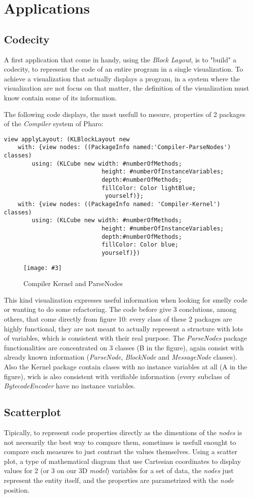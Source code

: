 \documentclass[runningheads]{llncs}
\newcommand{\fig}[4]{
	\begin{figure}[#1]
		\centering
		\texttt{[image: \#3]}
		\caption{\label{fig:#3}#4}
	\end{figure}}
\newcommand{\seclabel}[1]{\label{sec:#1}}
\begin{document}
\section{Applications} \seclabel{applications}

\subsection{Codecity}
A first application that come in handy, using the \emph{Block Layout},
is to "build" a codecity, to represent the code of an entire program
in a single visualization. To achieve a visualization that actually 
displays a program, in a system where the visualization are not focus
on that matter, the definition of the visualization must know contain
some of its information.

The following code displays, the most usefull to mesure, properties of 
2 packages of the \emph{Compiler} system of Pharo:
\begin{lstlisting}
view applyLayout: (KLBlockLayout new
	with: {view nodes: ((PackageInfo named:'Compiler-ParseNodes') classes) 
		using: (KLCube new width: #numberOfMethods; 
							height: #numberOfInstanceVariables; 
							depth:#numberOfMethods;
							fillColor: Color lightBlue;
							 yourself)};
	with: {view nodes: ((PackageInfo named: 'Compiler-Kernel') classes)
		using: (KLCube new width: #numberOfMethods; 
							height: #numberOfInstanceVariables; 
							depth:#numberOfMethods;
							fillColor: Color blue;
							yourself)})
\end{lstlisting}
\fig{}{1.0}{figure10.png}{Compiler Kernel and ParseNodes}
This kind visualization expresses useful information when looking for
smelly code or wanting to do some refactoring. The code before give 3 
conclutions, among others, that come directly from figure 10:
every class of these 2 packages are highly functional, they are not
meant to actually represent a structure with lots of variables, which
is consistent with their real purpose. The \emph{ParseNodes} package
functionalities are concentrated on 3 classes (B in the figure), 
again consist with already known information (\emph{ParseNode}, 
\emph{BlockNode} and \emph{MessageNode} classes). Also the {Kernel} 
package contain clases with no instance variables at all (A in the figure),
wich is also consistent with verifiable information (every subclass of 
\emph{BytecodeEncoder} have no instance variables. 


\subsection{Scatterplot}
Tipically, to represent code properties directly as the dimentions
of the \emph{nodes} is not necesarily the best way to compare 
them, sometimes is usefull enought to compare such measures to 
just contrast the values themselves. Using a scatter plot, 
a type of mathematical diagram that use Cartesian coordinates to 
display values for 2 (or 3 on our 3D \emph{model}) variables for 
a set of data, the \emph{nodes} just represent the entity itself, 
and the properties are  parametrized with the \emph{node} position.
\end{document}
